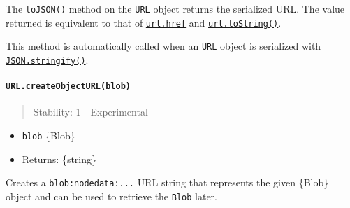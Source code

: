 The \texttt{toJSON()} method on the \texttt{URL} object returns the
serialized URL. The value returned is equivalent to that of
\hyperref[urlhref]{\texttt{url.href}} and
\hyperref[urltostring]{\texttt{url.toString()}}.

This method is automatically called when an \texttt{URL} object is
serialized with
\href{https://developer.mozilla.org/en-US/docs/Web/JavaScript/Reference/Global_Objects/JSON/stringify}{\texttt{JSON.stringify()}}.

\begin{Shaded}
\begin{Highlighting}[]
\OperatorTok{=}\NormalTok{ [}
   \NormalTok{(}\NormalTok{)}\OperatorTok{,}
   \NormalTok{(}\NormalTok{)}\OperatorTok{,}
\NormalTok{]}\OperatorTok{;}
\NormalTok{(}\OperatorTok{;}
\end{Highlighting}
\end{Shaded}

\paragraph{\texorpdfstring{\texttt{URL.createObjectURL(blob)}}{URL.createObjectURL(blob)}}\label{url.createobjecturlblob}

\begin{quote}
Stability: 1 - Experimental
\end{quote}

\begin{itemize}
\tightlist
\item
  \texttt{blob} \{Blob\}
\item
  Returns: \{string\}
\end{itemize}

Creates a \texttt{\textquotesingle{}blob:nodedata:...\textquotesingle{}}
URL string that represents the given \{Blob\} object and can be used to
retrieve the \texttt{Blob} later.

